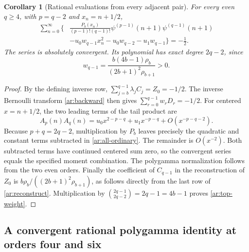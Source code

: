 \documentclass[11pt,a4paper]{article}
\numberwithin{equation}{section}
\newtheorem{corollary}[theorem]{Corollary}
\theoremstyle{definition}
\theoremstyle{remark}
\begin{document}
\begin{corollary}[Rational evaluations from every adjacent pair]
\label{ar:all-rational}
For every even $q\ge4$, with $p=q-2$ and $x_n=n+1/2$,
\begin{equation}\label{ar:all-ordinary}
 \begin{split}
 \sum_{n=0}^{\infty}\bigg\{
 &\frac{P_b(x_n)}{(p-1)!(q-1)!}
       \psi^{(p-1)}(n+1)\psi^{(q-1)}(n+1)\\
 &-u_0w_{q-1}x_n^2
      -u_0w_{q-2}-u_1w_{q-1}\bigg\}=-\frac12.
 \end{split}
\end{equation}
The series is absolutely convergent. Its polynomial has exact degree
$2q-2$, since
\begin{equation}\label{ar:top-weight}
       w_{q-1}
       =\frac{b(4b-1)\rho_b}{(2b+1)^2\rho_{b+1}}>0.
\end{equation}
\end{corollary}

\begin{proof}
By the defining inverse row, $\sum_{j=b}^{q-1}\lambda_jC_j=Z_0=-1/2$.
The inverse Bernoulli transform \eqref{ar:backward} then gives
$\sum_{r=0}^{q-1}w_rD_r=-1/2$.
For centered $x=n+1/2$, the two leading terms of the tail product are
\[
                 A_p(n)A_q(n)=u_0x^{2-p-q}+u_1x^{-p-q}
                                  +O(x^{-p-q-2}).
\]
Because $p+q=2q-2$, multiplication by $P_b$ leaves precisely the
quadratic and constant terms subtracted in \eqref{ar:all-ordinary}.
The remainder is $O(x^{-2})$. Both subtracted terms have continued
centered sum zero, so the convergent series equals the specified moment
combination. The polygamma normalization follows from the two even
orders. Finally the coefficient of $C_{q-1}$ in the reconstruction
of $Z_0$ is $b\rho_b/((2b+1)^2\rho_{b+1})$, as follows directly
from the last row of \eqref{ar:reconstruct}. Multiplication by
$\binom{2q-1}{2q-2}=2q-1=4b-1$ proves \eqref{ar:top-weight}.
\end{proof}

\subsection{A convergent rational polygamma identity at orders four and six}
\end{document}
